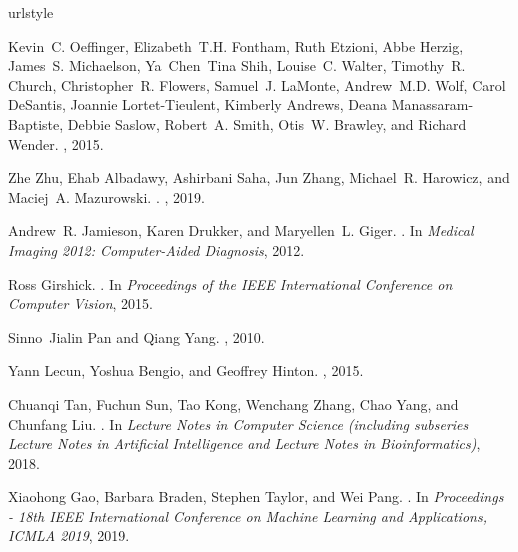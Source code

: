 \documentclass[12pt]{article}
\begin{document}


\begin{thebibliography}{100}
\providecommand{\natexlab}[1]{#1}
\expandafter\ifx\csname urlstyle\endcsname\relax
  \providecommand{\doi}[1]{doi:\discretionary{}{}{}#1}\else
  \providecommand{\doi}{doi:\discretionary{}{}{}\begingroup
  \urlstyle{rm}\Url}\fi

Kevin~C. Oeffinger, Elizabeth~T.H. Fontham, Ruth Etzioni, Abbe Herzig, James~S.
  Michaelson, Ya~Chen~Tina Shih, Louise~C. Walter, Timothy~R. Church,
  Christopher~R. Flowers, Samuel~J. LaMonte, Andrew~M.D. Wolf, Carol DeSantis,
  Joannie Lortet-Tieulent, Kimberly Andrews, Deana Manassaram-Baptiste, Debbie
  Saslow, Robert~A. Smith, Otis~W. Brawley, and Richard Wender.
, 2015.

Zhe Zhu, Ehab Albadawy, Ashirbani Saha, Jun Zhang, Michael~R. Harowicz, and
  Maciej~A. Mazurowski.
.
, 2019.

Andrew~R. Jamieson, Karen Drukker, and Maryellen~L. Giger.
.
\newblock In {\em Medical Imaging 2012: Computer-Aided Diagnosis}, 2012.

Ross Girshick.
.
\newblock In {\em Proceedings of the IEEE International Conference on Computer
  Vision}, 2015.

Sinno~Jialin Pan and Qiang Yang.
, 2010.

Yann Lecun, Yoshua Bengio, and Geoffrey Hinton.
, 2015.

Chuanqi Tan, Fuchun Sun, Tao Kong, Wenchang Zhang, Chao Yang, and Chunfang Liu.
.
\newblock In {\em Lecture Notes in Computer Science (including subseries
  Lecture Notes in Artificial Intelligence and Lecture Notes in
  Bioinformatics)}, 2018.

Xiaohong Gao, Barbara Braden, Stephen Taylor, and Wei Pang.
.
\newblock In {\em Proceedings - 18th IEEE International Conference on Machine
  Learning and Applications, ICMLA 2019}, 2019.


\end{thebibliography}
\end{document}
